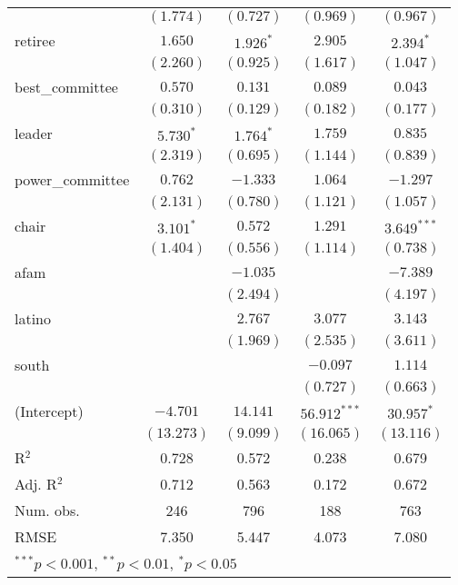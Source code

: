 \documentclass[12pt]{article}
\begin{document}
\begin{table}[H]
\begin{center}
\begin{tabular}{l c c c c }
			& $(1.774)$     & $(0.727)$     & $(0.969)$      & $(0.967)$     \\
			retiree                       & $1.650$       & $1.926^{*}$   & $2.905$        & $2.394^{*}$   \\
			& $(2.260)$     & $(0.925)$     & $(1.617)$      & $(1.047)$     \\
			best\_committee               & $0.570$       & $0.131$       & $0.089$        & $0.043$       \\
			& $(0.310)$     & $(0.129)$     & $(0.182)$      & $(0.177)$     \\
			leader                        & $5.730^{*}$   & $1.764^{*}$   & $1.759$        & $0.835$       \\
			& $(2.319)$     & $(0.695)$     & $(1.144)$      & $(0.839)$     \\
			power\_committee              & $0.762$       & $-1.333$      & $1.064$        & $-1.297$      \\
			& $(2.131)$     & $(0.780)$     & $(1.121)$      & $(1.057)$     \\
			chair                         & $3.101^{*}$   & $0.572$       & $1.291$        & $3.649^{***}$ \\
			& $(1.404)$     & $(0.556)$     & $(1.114)$      & $(0.738)$     \\
			afam                          &               & $-1.035$      &                & $-7.389$      \\
			&               & $(2.494)$     &                & $(4.197)$     \\
			latino                        &               & $2.767$       & $3.077$        & $3.143$       \\
			&               & $(1.969)$     & $(2.535)$      & $(3.611)$     \\
			south                         &               &               & $-0.097$       & $1.114$       \\
			&               &               & $(0.727)$      & $(0.663)$     \\
			(Intercept)                   & $-4.701$      & $14.141$      & $56.912^{***}$ & $30.957^{*}$  \\
			& $(13.273)$    & $(9.099)$     & $(16.065)$     & $(13.116)$    \\
			\hline
			R$^2$                         & 0.728         & 0.572         & 0.238          & 0.679         \\
			Adj. R$^2$                    & 0.712         & 0.563         & 0.172          & 0.672         \\
			Num. obs.                     & 246           & 796           & 188            & 763           \\
			RMSE                          & 7.350         & 5.447         & 4.073          & 7.080         \\
			\hline
			\multicolumn{5}{l}{\scriptsize{$^{***}p<0.001$, $^{**}p<0.01$, $^*p<0.05$}}
		\end{tabular}
	\end{center}
\end{table}
\end{document}
